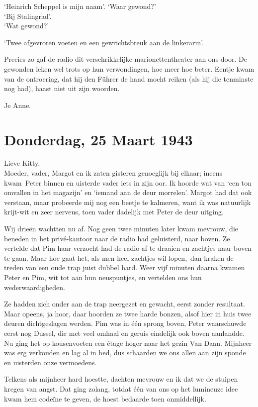 \documentclass{book}
\begin{document}
`Heinrich Scheppel is mijn naam'. `Waar gewond?'\\`Bij
Stalingrad'.\\`Wat gewond?'

`Twee afgevroren voeten en een gewrichtsbreuk aan de linkerarm'.

Precies zo gaf de radio dit verschrikkelijke marionettentheater aan ons
door. De gewonden leken wel trots op hun verwondingen, hoe meer hoe
beter. Eentje kwam van de ontroering, dat hij den Führer de hand mocht
reiken (als hij die tenminste nog had), haast niet uit zijn woorden.

Je Anne.

\chapter{Donderdag, 25 Maart 1943}

Lieve Kitty,\\Moeder, vader, Margot en ik zaten gisteren genoeglijk bij
elkaar; ineens kwam~Peter binnen en uisterde vader iets in zijn oor. Ik
hoorde wat van `een ton omvallen in het magazijn' en `iemand aan de deur
morrelen'. Margot had dat ook verstaan, maar probeerde mij nog een
beetje te kalmeren, want ik was natuurlijk krijt-wit en zeer nerveus,
toen vader dadelijk met Peter de deur uitging.

Wij drieën wachtten nu af. Nog geen twee minuten later kwam mevrouw, die
beneden in het privé-kantoor naar de radio had geluisterd, naar boven.
Ze vertelde dat Pim haar verzocht had de radio af te draaien en zachtjes
naar boven te gaan. Maar hoe gaat het, als men heel zachtjes wil
lopen,~dan kraken de treden van een oude trap juist dubbel hard. Weer
vijf minuten daarna kwamen Peter en Pim, wit tot aan hun neuspuntjes, en
vertelden ons hun wederwaardigheden.

Ze hadden zich onder aan de trap neergezet en gewacht, eerst zonder
resultaat. Maar opeens, ja hoor, daar hoorden ze twee harde bonzen,
alsof hier in huis twee deuren dichtgeslagen werden. Pim was in één
sprong boven, Peter waarschuwde eerst nog Dussel, die met veel omhaal en
geruis eindelijk ook boven aanlandde. Nu ging het op kousenvoeten een
étage hoger naar het gezin Van Daan. Mijnheer was erg verkouden en lag
al in bed, dus schaarden we ons allen aan zijn sponde en uisterden onze
vermoedens.

Telkens als mijnheer hard hoestte, dachten mevrouw en ik dat we de
stuipen kregen van angst. Dat ging zolang, totdat één van ons op het
lumineuze idee kwam hem codeïne te geven, de hoest bedaarde toen
onmiddellijk.
\end{document}
